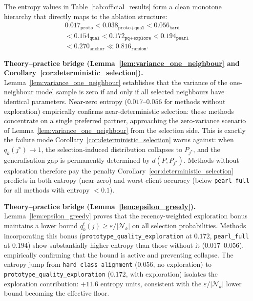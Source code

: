 \documentclass[conference]{IEEEtran}
\begin{document}
The entropy values in Table~\ref{tab:official_results} form a clean monotone hierarchy that directly maps to the ablation structure:
\begin{equation}
\begin{gathered}
0.017_{\texttt{proto}} < 0.038_{\texttt{proto+qual}} <
0.056_{\texttt{hard}}\\
< 0.154_{\texttt{qual}} < 0.172_{\texttt{pq+explore}} <
0.194_{\texttt{pearl}}\\
< 0.270_{\texttt{anchor}} \ll 0.816_{\texttt{random}}.
\end{gathered}
\end{equation}

\textbf{Theory--practice bridge (Lemma~\ref{lem:variance_one_neighbour} and Corollary~\ref{cor:deterministic_selection}).}
Lemma~\ref{lem:variance_one_neighbour} establishes that the variance of the one-neighbour model sample is zero if and only if all selected neighbours have identical parameters. Near-zero entropy ($0.017$--$0.056$ for methods without exploration) empirically confirms near-deterministic selection: these methods concentrate on a single preferred partner, approaching the zero-variance scenario of Lemma~\ref{lem:variance_one_neighbour} from the selection side. This is exactly the failure mode Corollary~\ref{cor:deterministic_selection} warns against: when $q_k(j^\star) \to 1$, the selection-induced distribution collapses to $P_{j^\star}$, and the generalisation gap is permanently determined by $d(P, P_{j^\star})$. Methods without exploration therefore pay the penalty Corollary~\ref{cor:deterministic_selection} predicts in both entropy (near-zero) and worst-client accuracy (below \texttt{pearl\_full} for all methods with entropy $<0.1$).

\textbf{Theory--practice bridge (Lemma~\ref{lem:epsilon_greedy}).}
Lemma~\ref{lem:epsilon_greedy} proves that the recency-weighted exploration bonus maintains a lower bound $q_k^t(j) \geq \varepsilon/|\mathcal{N}_k|$ on all selection probabilities. Methods incorporating this bonus (\texttt{prototype\_quality\_exploration} at $0.172$, \texttt{pearl\_full} at $0.194$) show substantially higher entropy than those without it ($0.017$--$0.056$), empirically confirming that the bound is active and preventing collapse. The entropy jump from \texttt{hard\_class\_alignment} ($0.056$, no exploration) to \texttt{prototype\_quality\_exploration} ($0.172$, with exploration) isolates the exploration contribution: $+11.6$ entropy units, consistent with the $\varepsilon/|\mathcal{N}_k|$ lower bound becoming the effective floor.
\end{document}
